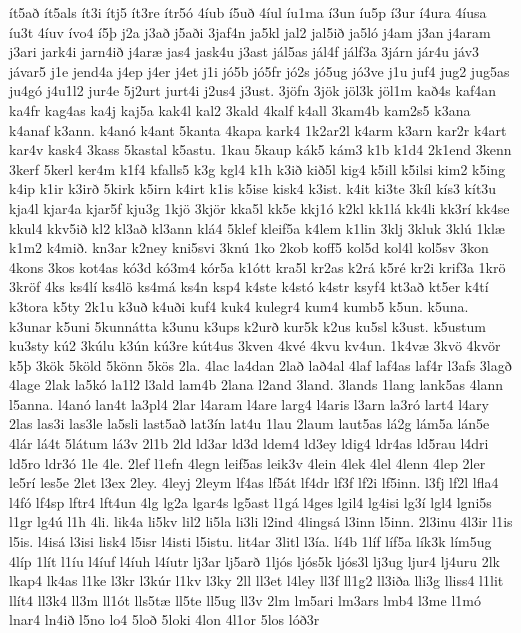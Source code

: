 {ít5að
ít5als
ít3i
ítj5
ít3re
ítr5ó
4íub
í5uð
4íul
íu1ma
í3un
íu5p
í3ur
í4ura
4íusa
íu3t
4íuv
ívo4
í5þ
j2a
j3að
j5aði
3jaf4n
ja5kl
jal2
jal5ið
ja5ló
j4am
j3an
j4aram
j3ari
jark4i
jarn4ið
j4aræ
jas4
jask4u
j3ast
jál5as
jál4f
jálf3a
3járn
jár4u
jáv3
jávar5
j1e
jend4a
j4ep
j4er
j4et
j1i
jó5b
jó5fr
jó2s
jó5ug
jó3ve
j1u
juf4
jug2
jug5as
ju4gó
j4u1l2
jur4e
5j2urt
jurt4i
j2us4
j3ust.
3jöfn
3jök
jöl3k
jöl1m
kað4s
kaf4an
ka4fr
kag4as
ka4j
kaj5a
kak4l
kal2
3kald
4kalf
k4all
3kam4b
kam2s5
k3ana
k4anaf
k3ann.
k4anó
k4ant
5kanta
4kapa
kark4
1k2ar2l
k4arm
k3arn
kar2r
k4art
kar4v
kask4
3kass
5kastal
k5astu.
1kau
5kaup
kák5
kám3
k1b
k1d4
2k1end
3kenn
3kerf
5kerl
ker4m
k1f4
kfalls5
k3g
kgl4
k1h
k3ið
kið5l
kig4
k5ill
k5ilsi
kim2
k5ing
k4ip
k1ir
k3irð
5kirk
k5irn
k4irt
k1is
k5ise
kisk4
k3ist.
k4it
ki3te
3kíl
kís3
kít3u
kja4l
kjar4a
kjar5f
kju3g
1kjö
3kjör
kka5l
kk5e
kkj1ó
k2kl
kk1lá
kk4li
kk3rí
kk4se
kkul4
kkv5ið
kl2
kl3að
kl3ann
klá4
5klef
kleif5a
k4lem
k1lin
3klj
3kluk
3klú
1klæ
k1m2
k4mið.
kn3ar
k2ney
kni5svi
3knú
1ko
2kob
koff5
kol5d
kol4l
kol5sv
3kon
4kons
3kos
kot4as
kó3d
kó3m4
kór5a
k1ótt
kra5l
kr2as
k2rá
k5ré
kr2i
krif3a
1krö
3kröf
4ks
ks4lí
ks4lö
ks4má
ks4n
ksp4
k4ste
k4stó
k4str
ksyf4
kt3að
kt5er
k4tí
k3tora
k5ty
2k1u
k3uð
k4uði
kuf4
kuk4
kulegr4
kum4
kumb5
k5un.
k5una.
k3unar
k5uni
5kunnátta
k3unu
k3ups
k2urð
kur5k
k2us
ku5sl
k3ust.
k5ustum
ku3sty
kú2
3kúlu
k3ún
kú3re
kút4us
3kven
4kvé
4kvu
kv4un.
1k4væ
3kvö
4kvör
k5þ
3kök
5köld
5könn
5kös
2la.
4lac
la4dan
2lað
lað4al
4laf
laf4as
laf4r
l3afs
3lagð
4lage
2lak
la5kó
la1l2
l3ald
lam4b
2lana
l2and
3land.
3lands
1lang
lank5as
4lann
l5anna.
l4anó
lan4t
la3pl4
2lar
l4aram
l4are
larg4
l4aris
l3arn
la3ró
lart4
l4ary
2las
las3i
las3le
la5sli
last5að
lat3ín
lat4u
1lau
2laum
laut5as
lá2g
lám5a
lán5e
4lár
lá4t
5látum
lá3v
2l1b
2ld
ld3ar
ld3d
ldem4
ld3ey
ldig4
ldr4as
ld5rau
l4dri
ld5ro
ldr3ó
1le
4le.
2lef
l1efn
4legn
leif5as
leik3v
4lein
4lek
4lel
4lenn
4lep
2ler
le5rí
les5e
2let
l3ex
2ley.
4leyj
2leym
lf4as
lf5át
lf4dr
lf3f
lf2i
lf5inn.
l3fj
lf2l
lfla4
l4fó
lf4sp
lftr4
lft4un
4lg
lg2a
lgar4s
lg5ast
l1gá
l4ges
lgil4
lg4isi
lg3í
lgl4
lgni5s
l1gr
lg4ú
l1h
4li.
lik4a
li5kv
lil2
li5la
li3li
l2ind
4lingsá
l3inn
l5inn.
2l3inu
4l3ir
l1is
l5is.
l4isá
l3isi
lisk4
l5isr
l4isti
l5istu.
lit4ar
3litl
l3ía.
lí4b
1líf
líf5a
lík3k
lím5ug
4líp
1lít
l1íu
l4íuf
l4íuh
l4íutr
lj3ar
lj5arð
1ljós
ljós5k
ljós3l
lj3ug
ljur4
lj4uru
2lk
lkap4
lk4as
l1ke
l3kr
l3kúr
l1kv
l3ky
2ll
ll3et
l4ley
ll3f
ll1g2
ll3iða
lli3g
lliss4
l1lit
llít4
ll3k4
ll3m
ll1ót
lls5tæ
ll5te
ll5ug
ll3v
2lm
lm5ari
lm3ars
lmb4
l3me
l1mó
lnar4
ln4ið
l5no
lo4
5loð
5loki
4lon
4l1or
5los
lóð3r
}
